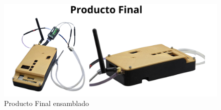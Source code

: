 \begin{figure}[H]
    \centering
    \includegraphics[width=12 cm]{Imagenes/Metodologia/producto final.png}
    \caption{Producto Final ensamblado}
    \label{fig:ensamble}
\end{figure}


